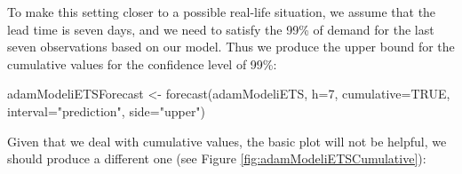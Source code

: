 \documentclass[
]{book}
\newenvironment{Shaded}{\begin{snugshade}}{\end{snugshade}}
\newcommand{\AttributeTok}[1]{\textcolor[rgb]{0.77,0.63,0.00}{#1}}
\newcommand{\ConstantTok}[1]{\textcolor[rgb]{0.00,0.00,0.00}{#1}}
\newcommand{\DecValTok}[1]{\textcolor[rgb]{0.00,0.00,0.81}{#1}}
\newcommand{\FunctionTok}[1]{\textcolor[rgb]{0.00,0.00,0.00}{#1}}
\newcommand{\NormalTok}[1]{#1}
\newcommand{\OtherTok}[1]{\textcolor[rgb]{0.56,0.35,0.01}{#1}}
\newcommand{\SpecialCharTok}[1]{\textcolor[rgb]{0.00,0.00,0.00}{#1}}
\newcommand{\StringTok}[1]{\textcolor[rgb]{0.31,0.60,0.02}{#1}}
\theoremstyle{definition}
\theoremstyle{definition}
\theoremstyle{definition}
\theoremstyle{definition}
\theoremstyle{remark}
\begin{document}
To make this setting closer to a possible real-life situation, we assume that the lead time is seven days, and we need to satisfy the 99\% of demand for the last seven observations based on our model. Thus we produce the upper bound for the cumulative values for the confidence level of 99\%:

\begin{Shaded}
\begin{Highlighting}[]
\NormalTok{adamModeliETSForecast }\OtherTok{\textless{}{-}} \FunctionTok{forecast}\NormalTok{(adamModeliETS, }\AttributeTok{h=}\DecValTok{7}\NormalTok{,}
                                  \AttributeTok{cumulative=}\ConstantTok{TRUE}\NormalTok{,}
                                  \AttributeTok{interval=}\StringTok{"prediction"}\NormalTok{,}
                                  \AttributeTok{side=}\StringTok{"upper"}\NormalTok{)}
\end{Highlighting}
\end{Shaded}

Given that we deal with cumulative values, the basic plot will not be helpful, we should produce a different one (see Figure \ref{fig:adamModeliETSCumulative}):

\begin{Shaded}
\end{Shaded}
\end{document}
